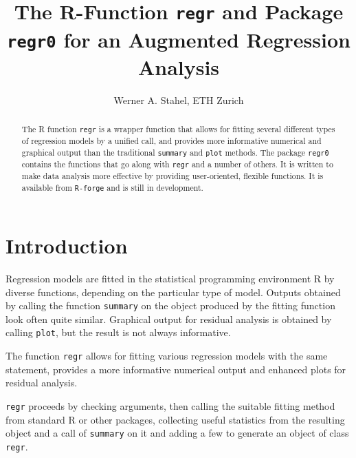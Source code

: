 \documentclass{article}
\providecommand{\T}{\texttt}
\begin{document}
\title{\vspace*{-10mm}
The R-Function \T{regr} and Package \T{regr0} for an Augmented 
Regression Analysis}
\author{Werner A. Stahel, ETH Zurich}
\maketitle

\begin{abstract}\noindent
The R function \T{regr} is a wrapper function that allows for fitting
several different types of regression models by a unified call, and
provides more informative numerical and graphical output than the 
traditional \T{summary} and \T{plot} methods.
The package \T{regr0} contains the functions that go along with 
\T{regr} and a number of others.
It is written to make data analysis more effective by providing
user-oriented, flexible functions.
It is available from \T{R-forge} and is still in development.
\end{abstract}

\section{Introduction}

Regression models are fitted in the statistical programming environment R 
by diverse functions, depending on the particular type of model.
Outputs obtained by calling the function \T{summary} on the object produced
by the fitting function look often quite similar. Graphical output for
residual analysis is obtained by calling \T{plot}, but the result is not
always informative. 

The function \T{regr} allows for fitting various regression models
with the same statement, provides a more informative numerical output
and enhanced plots for residual analysis. 

\T{regr} proceeds by 
checking arguments, then calling the suitable fitting method from standard
R or other packages,
collecting useful statistics from the resulting object and a call of 
\T{summary} on it and adding a few to generate an object of class
\T{regr}. 
\end{document}
